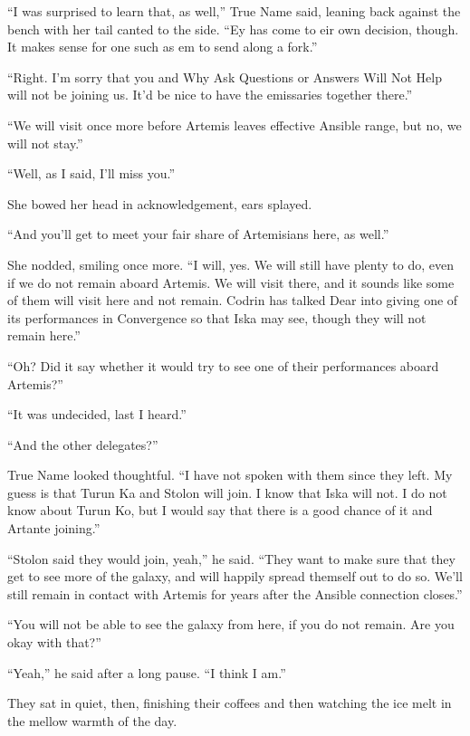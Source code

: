 ``I was surprised to learn that, as well,'' True Name said, leaning back against the bench with her tail canted to the side. ``Ey has come to eir own decision, though. It makes sense for one such as em to send along a fork.''

``Right. I'm sorry that you and Why Ask Questions or Answers Will Not Help will not be joining us. It'd be nice to have the emissaries together there.''

``We will visit once more before Artemis leaves effective Ansible range, but no, we will not stay.''

``Well, as I said, I'll miss you.''

She bowed her head in acknowledgement, ears splayed.

``And you'll get to meet your fair share of Artemisians here, as well.''

She nodded, smiling once more. ``I will, yes. We will still have plenty to do, even if we do not remain aboard Artemis. We will visit there, and it sounds like some of them will visit here and not remain. Codrin has talked Dear into giving one of its performances in Convergence so that Iska may see, though they will not remain here.''

``Oh? Did it say whether it would try to see one of their performances aboard Artemis?''

``It was undecided, last I heard.''

``And the other delegates?''

True Name looked thoughtful. ``I have not spoken with them since they left. My guess is that Turun Ka and Stolon will join. I know that Iska will not. I do not know about Turun Ko, but I would say that there is a good chance of it and Artante joining.''

``Stolon said they would join, yeah,'' he said. ``They want to make sure that they get to see more of the galaxy, and will happily spread themself out to do so. We'll still remain in contact with Artemis for years after the Ansible connection closes.''

``You will not be able to see the galaxy from here, if you do not remain. Are you okay with that?''

``Yeah,'' he said after a long pause. ``I think I am.''

They sat in quiet, then, finishing their coffees and then watching the ice melt in the mellow warmth of the day.
